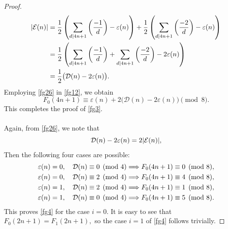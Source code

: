 \documentclass[12pt]{article}
\numberwithin{equation}{section}
\theoremstyle{definition}
\theoremstyle{remark}
\numberwithin{equation}{section}
\begin{document}
\begin{proof}
\begin{align}
|\mathcal{E}(n)|
&=
\dfrac{1}{2}
\left(
\sum_{d\mid 4n+1}\left(\dfrac{-1}{d}\right)
-
\varepsilon(n)
\right)
+
\dfrac{1}{2}
\left(
\sum_{d\mid 4n+1}\left(\dfrac{-2}{d}\right)
-
\varepsilon(n)
\right) \notag\\
&=
\dfrac{1}{2}
\left(
\sum_{d\mid 4n+1}\left(\dfrac{-1}{d}\right)
+
\sum_{d\mid 4n+1}\left(\dfrac{-2}{d}\right)
-
2\varepsilon(n)
\right) \notag\\
&=
\dfrac{1}{2}\bigl(\mathcal{D}(n)-2\varepsilon(n)\bigr).
\label{fg26}
\end{align}
Employing \eqref{fg26} in \eqref{fg12}, we obtain
\begin{equation}
F_0(4n+1)
\equiv
\varepsilon(n)+2\bigl(\mathcal{D}(n)-2\varepsilon(n)\bigr)
\pmod 8.
\end{equation}
This completes the proof of \eqref{fg3}. \\\\
Again,  from \eqref{fg26}, we note that
\begin{equation}
\mathcal{D}(n)-2\varepsilon(n)=2|\mathcal{E}(n)|,\notag
\end{equation}
Then the following four cases are possible:
\begin{align}
\varepsilon(n)=0,\quad \mathcal{D}(n)\equiv0\pmod4
&\Longrightarrow
F_0(4n+1)\equiv0\pmod8,\notag\\
\varepsilon(n)=0,\quad \mathcal{D}(n)\equiv2\pmod4
&\Longrightarrow
F_0(4n+1)\equiv4\pmod8,\notag\\
\varepsilon(n)=1,\quad \mathcal{D}(n)\equiv2\pmod4
&\Longrightarrow
F_0(4n+1)\equiv1\pmod8,\notag\\
\varepsilon(n)=1,\quad \mathcal{D}(n)\equiv0\pmod4
&\Longrightarrow
F_0(4n+1)\equiv5\pmod8.\notag
\end{align}
This proves \eqref{fg4} for the case $i=0$. It is easy to see that $F_0(2n+1)=F_1(2n+1),$ so the case  $i=1$ of \eqref{fg4} follows trivially.
\end{proof}
\end{document}
